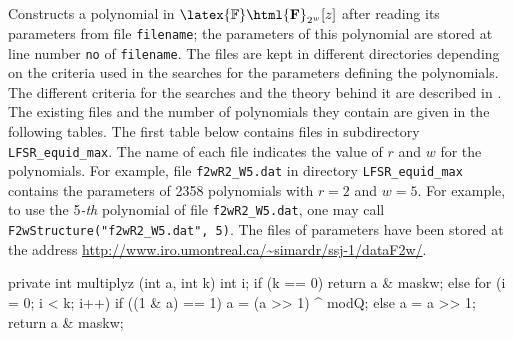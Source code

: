  \begin{tabb}
   Constructs a polynomial in $\latex{\mathbb{F}}\html{\mathbf{F}}_{2^w}[z]$
   after reading its parameters from file {\texttt{filename}};
   the parameters of this polynomial are stored  at line number
   {\texttt{no}} of {\texttt{filename}}.
   The files are kept in different
   directories depending on the criteria used in the searches for the
   parameters defining the polynomials. The different criteria for the
   searches and the theory behind it are described in \cite{rPAN04d,rPAN04t}.
   The existing files and the number of polynomials they contain are
   given in the following tables.
   The first table below contains files in subdirectory
    \texttt{LFSR\_equid\_max}. The name of each
   file indicates the value of $r$ and $w$ for the polynomials.
   For example, file \texttt{f2wR2\_W5.dat} in directory
   \texttt{LFSR\_equid\_max} contains the parameters of 2358
   polynomials with $r=2$ and $w=5$. For example, to use the 5\textit{-th}
    polynomial of file \texttt{f2wR2\_W5.dat}, one may call
   \texttt{F2wStructure("f2wR2\_W5.dat", 5)}.
   The files of parameters have been stored at the address
   \url{http://www.iro.umontreal.ca/~simardr/ssj-1/dataF2w/}.

 \end{tabb}
\begin{code}
\begin{hide}

   private int multiplyz (int a, int k)
   {
      int i;
      if (k == 0)
         return a & maskw;
      else {
         for (i = 0; i < k; i++) {
            if ((1 & a) == 1) {
               a = (a >> 1) ^ modQ;
            } else
               a = a >> 1;
         }
         return a & maskw;
      }
   }\end{hide}
\end{code}
